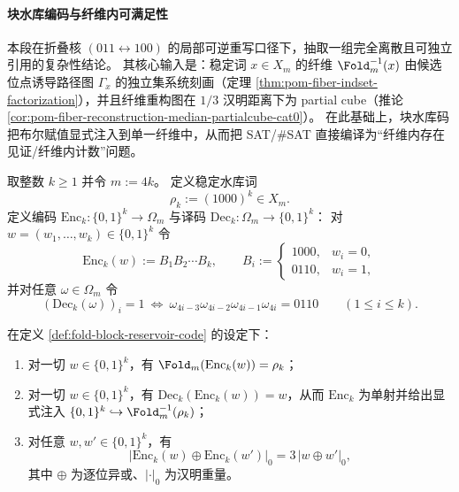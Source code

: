 \paragraph{块水库编码与纤维内可满足性}
本段在折叠核 \((011\leftrightarrow 100)\) 的局部可逆重写口径下，抽取一组完全离散且可独立引用的复杂性结论。
其核心输入是：稳定词 \(x\in X_m\) 的纤维 \(\Fold_m^{-1}(x)\) 由候选位点诱导路径图 \(\Gamma_x\) 的独立集系统刻画（定理 \ref{thm:pom-fiber-indset-factorization}），并且纤维重构图在 \(1/3\) 汉明距离下为 partial cube（推论 \ref{cor:pom-fiber-reconstruction-median-partialcube-cat0}）。
在此基础上，块水库码把布尔赋值显式注入到单一纤维中，从而把 SAT/\(\#\)SAT 直接编译为“纤维内存在见证/纤维内计数”问题。

\begin{definition}[水库词与块码]\label{def:fold-block-reservoir-code}
取整数 \(k\ge 1\) 并令 \(m:=4k\)。
定义稳定水库词
\[
\rho_k:=(1000)^k\in X_m.
\]
定义编码 \(\mathrm{Enc}_k:\{0,1\}^k\to \Omega_m\) 与译码 \(\mathrm{Dec}_k:\Omega_m\to\{0,1\}^k\)：
对 \(w=(w_1,\dots,w_k)\in\{0,1\}^k\) 令
\[
\mathrm{Enc}_k(w):=B_1B_2\cdots B_k,\qquad
B_i:=
\begin{cases}
1000,& w_i=0,\\
0110,& w_i=1,
\end{cases}
\]
并对任意 \(\omega\in\Omega_m\) 令
\[
(\mathrm{Dec}_k(\omega))_i=1\ \Longleftrightarrow\ \omega_{4i-3}\omega_{4i-2}\omega_{4i-1}\omega_{4i}=0110
\qquad (1\le i\le k).
\]
\end{definition}

\begin{theorem}[块水库编码的纤维注入与三倍等距性]\label{thm:fold-block-reservoir-encoding-constant-radius}
在定义 \ref{def:fold-block-reservoir-code} 的设定下：
\begin{enumerate}
  \item 对一切 \(w\in\{0,1\}^k\)，有 \(\Fold_m(\mathrm{Enc}_k(w))=\rho_k\)；
  \item 对一切 \(w\in\{0,1\}^k\)，有 \(\mathrm{Dec}_k(\mathrm{Enc}_k(w))=w\)，从而 \(\mathrm{Enc}_k\) 为单射并给出显式注入 \(\{0,1\}^k\hookrightarrow \Fold_m^{-1}(\rho_k)\)；
  \item 对任意 \(w,w'\in\{0,1\}^k\)，有
  \[
  \bigl|\mathrm{Enc}_k(w)\oplus \mathrm{Enc}_k(w')\bigr|_0
  =3\,|w\oplus w'|_0,
  \]
  其中 \(\oplus\) 为逐位异或、\(|\cdot|_0\) 为汉明重量。
\end{enumerate}
\end{theorem}

